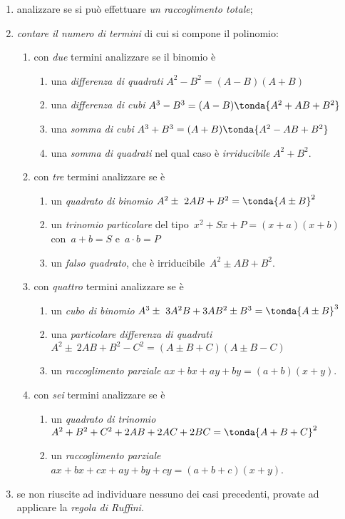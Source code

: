 \begin{enumerate}
\item analizzare se si può effettuare \emph{un raccoglimento totale};
\item \emph{contare il numero di termini} di cui si compone il polinomio:
 \begin{enumerate}
  \item con \emph{due} termini analizzare se il binomio è
   \begin{enumerate}
	\item una \emph{differenza di quadrati} 
	 \(A^{2}-B^{2}=(A-B)(A+B)\)
	\item una \emph{differenza di cubi}
	 \(A^{3}-B^{3}=(A-B)\tonda{A^{2}+AB+B^{2}}\)
	\item una \emph{somma di cubi} 
	 \(A^{3}+B^{3}=(A+B)\tonda{A^{2}-AB+B^{2}}\)
	\item una \emph{somma di quadrati} nel qual caso è \emph{irriducibile} 
	 \(A^{2}+B^{2}\).
   \end{enumerate}
  \item con \emph{tre} termini analizzare se è
   \begin{enumerate}
	\item un \emph{quadrato di binomio} 
	 \(A^{2}\pm~2AB+B^{2}=\tonda{A\pm B}^{2}\)
	\item un \emph{trinomio particolare} del tipo~\(x^2+Sx+P=(x+a)(x+b)\) 
	 con~\(a+b=S\) e~\(a\cdot b=P\)
	\item un \emph{falso quadrato}, che è irriducibile~\(A^{2}\pm AB+B^{2}\).
   \end{enumerate}
  \item con \emph{quattro} termini analizzare se è
   \begin{enumerate}
	\item un \emph{cubo di binomio} 
	 \(A^{3}\pm~3A^{2}B+3AB^{2}\pm B^{3}=\tonda{A\pm B}^{3}\)
	\item una \emph{particolare differenza di quadrati}
	 \subitem \(A^{2}\pm~2AB+B^{2}-C^{2}=(A\pm B+C)(A\pm B-C)\)
	\item un \emph{raccoglimento parziale} \(ax+bx+ay+by=(a+b)(x+y)\).
   \end{enumerate}
  \item con \emph{sei} termini analizzare se è
   \begin{enumerate}
	\item un \emph{quadrato di trinomio} 
	 \(A^{2}+B^{2}+C^{2}+2AB+2{AC}+2{BC}=\tonda{A+B+C}^{2}\)
	\item un \emph{raccoglimento parziale}
	 \subitem \(ax+{bx}+{cx}+{ay}+{by}+{cy}=(a+b+c)(x+y)\).
   \end{enumerate}
  \end{enumerate}
 \item se non riuscite ad individuare nessuno dei casi precedenti, provate ad 
  applicare la \emph{regola di Ruffini}.
\end{enumerate}


